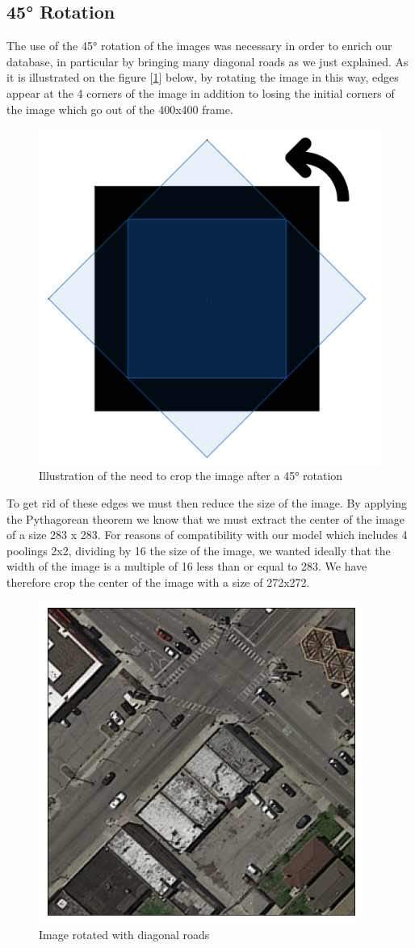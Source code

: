 \documentclass[10pt,conference,compsocconf]{IEEEtran}
\begin{document}
\subsection{45° Rotation}
The use of the 45° rotation of the images was necessary in order to enrich our database, in particular by bringing many diagonal roads as we just explained. 
As it is illustrated on the figure [\ref{fig:carrerotation}] below, by rotating the image in this way, edges appear at the 4 corners of the image in addition to losing the initial corners of the image which go out of the 400x400 frame.
\FloatBarrier
\begin{figure}[ht] \centering
    \includegraphics[width=0.49\columnwidth]{figures/carrerotation.png}
    \caption{Illustration of the need to crop the image after a 45° rotation}
    \label{fig:carrerotation}
\end{figure}
\FloatBarrier
To get rid of these edges we must then reduce the size of the image. By applying the Pythagorean theorem we know that we must extract the center of the image of a size 283 x 283. For reasons of compatibility with our model which includes 4 poolings 2x2, dividing by 16 the size of the image, we wanted ideally that the width of the image is a multiple of 16 less than or equal to 283. We have therefore crop the center of the image with a size of 272x272.

\FloatBarrier
\begin{figure}[ht] \centering
    \includegraphics[width=0.49\columnwidth]{figures/trainrotate.png}
    \caption{Image rotated with diagonal roads}
    \label{fig:trainrotate}
\end{figure}
\FloatBarrier
\end{document}
